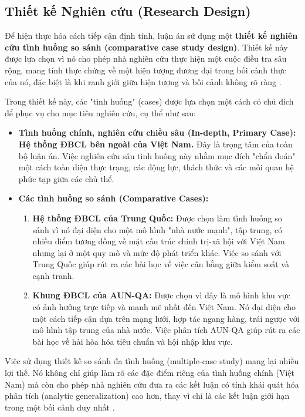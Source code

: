 \documentclass[12pt, a4paper, openany]{report}
\begin{document}
\subsection{Thiết kế Nghiên cứu (Research Design)}
\label{subsec:thiet_ke_nghien_cuu}

Để hiện thực hóa cách tiếp cận định tính, luận án sử dụng một \textbf{thiết kế nghiên cứu tình huống so sánh (comparative case study design)}. Thiết kế này được lựa chọn vì nó cho phép nhà nghiên cứu thực hiện một cuộc điều tra sâu rộng, mang tính thực chứng về một hiện tượng đương đại trong bối cảnh thực của nó, đặc biệt là khi ranh giới giữa hiện tượng và bối cảnh không rõ ràng \cite{Yin2018}.

Trong thiết kế này, các "tình huống" (cases) được lựa chọn một cách có chủ đích để phục vụ cho mục tiêu nghiên cứu, cụ thể như sau:
\begin{itemize}
    \item \textbf{Tình huống chính, nghiên cứu chiều sâu (In-depth, Primary Case): Hệ thống ĐBCL bên ngoài của Việt Nam.} Đây là trọng tâm của toàn bộ luận án. Việc nghiên cứu sâu tình huống này nhằm mục đích "chẩn đoán" một cách toàn diện thực trạng, các động lực, thách thức và các mối quan hệ phức tạp giữa các chủ thể.
    
    \item \textbf{Các tình huống so sánh (Comparative Cases):}
    \begin{enumerate}
        \item \textbf{Hệ thống ĐBCL của Trung Quốc:} Được chọn làm tình huống so sánh vì nó đại diện cho một mô hình "nhà nước mạnh", tập trung, có nhiều điểm tương đồng về mặt cấu trúc chính trị-xã hội với Việt Nam nhưng lại ở một quy mô và mức độ phát triển khác. Việc so sánh với Trung Quốc giúp rút ra các bài học về việc cân bằng giữa kiểm soát và cạnh tranh.
        \item \textbf{Khung ĐBCL của AUN-QA:} Được chọn vì đây là mô hình khu vực có ảnh hưởng trực tiếp và mạnh mẽ nhất đến Việt Nam. Nó đại diện cho một cách tiếp cận dựa trên mạng lưới, hợp tác ngang hàng, trái ngược với mô hình tập trung của nhà nước. Việc phân tích AUN-QA giúp rút ra các bài học về hài hòa hóa tiêu chuẩn và hội nhập khu vực.
    \end{enumerate}
\end{itemize}

Việc sử dụng thiết kế so sánh đa tình huống (multiple-case study) mang lại nhiều lợi thế. Nó không chỉ giúp làm rõ các đặc điểm riêng của tình huống chính (Việt Nam) mà còn cho phép nhà nghiên cứu đưa ra các kết luận có tính khái quát hóa phân tích (analytic generalization) cao hơn, thay vì chỉ là các kết luận giới hạn trong một bối cảnh duy nhất \cite{Yin2018}.
\end{document}
